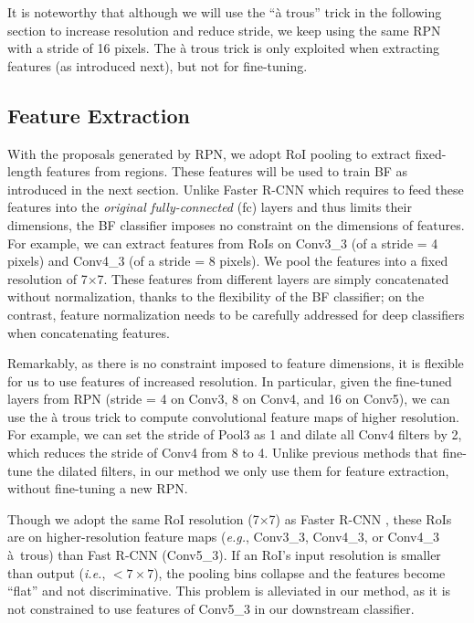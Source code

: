 \documentclass[runningheads]{llncs}
\def\eg{\emph{e.g.}}
\def\ie{\emph{i.e.}}
\begin{document}
It is noteworthy that although we will use the ``{\`a} trous'' \cite{chen2014semantic} trick in the following section to increase resolution and reduce stride, we keep using the same RPN with a stride of 16 pixels. The {\`a} trous trick is only exploited when extracting features (as introduced next), but not for fine-tuning.

\subsection{Feature Extraction}
\label{sec:feature}

With the proposals generated by RPN, we adopt RoI pooling \cite{girshickICCV15fastrcnn} to extract fixed-length features from regions. These features will be used to train BF as introduced in the next section. Unlike Faster R-CNN which requires to feed these features into the \emph{original fully-connected} (fc) layers and thus limits their dimensions, the BF classifier imposes no constraint on the dimensions of features. For example, we can extract features from RoIs on Conv3\_3 (of a stride = 4 pixels) and Conv4\_3 (of a stride = 8 pixels). We pool the features into a fixed resolution of 7$\times$7. These features from different layers are simply concatenated without normalization, thanks to the flexibility of the BF classifier; on the contrast, feature normalization needs to be carefully addressed \cite{liu2015parsenet} for deep classifiers when concatenating features.

Remarkably, as there is no constraint imposed to feature dimensions, it is flexible for us to use features of increased resolution. In particular, given the fine-tuned layers from RPN (stride = 4 on Conv3,  8 on Conv4, and 16 on Conv5), we can use the {\`a} trous trick \cite{chen2014semantic} to compute convolutional feature maps of higher resolution. For example, we can set the stride of Pool3 as 1 and dilate all Conv4 filters by 2, which reduces the stride of Conv4 from 8 to 4. Unlike previous methods \cite{long2015fully,chen2014semantic} that fine-tune the dilated filters, in our method we only use them for feature extraction, without fine-tuning a new RPN. 

Though we adopt the same RoI resolution (7$\times$7) as Faster R-CNN \cite{ren2015faster}, these RoIs are on higher-resolution feature maps (\eg, Conv3\_3, Conv4\_3, or Conv4\_3 {\`a}~trous) than Fast R-CNN (Conv5\_3). If an RoI's input resolution is smaller than output (\ie, $< 7\times7$), the pooling bins collapse and the features become ``flat'' and not discriminative. This problem is alleviated in our method, as it is not constrained to use features of Conv5\_3 in our downstream classifier.
\end{document}
